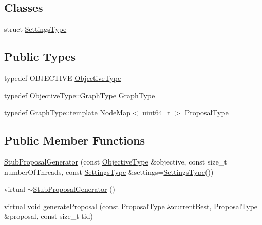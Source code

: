 \subsection*{Classes}
\begin{DoxyCompactItemize}
\item 
struct \hyperlink{structnifty_1_1graph_1_1optimization_1_1common_1_1StubProposalGenerator_1_1SettingsType}{Settings\+Type}
\end{DoxyCompactItemize}
\subsection*{Public Types}
\begin{DoxyCompactItemize}
\item 
typedef O\+B\+J\+E\+C\+T\+I\+V\+E \hyperlink{classnifty_1_1graph_1_1optimization_1_1common_1_1StubProposalGenerator_ae7d0ffc1c09e62f40d0dbee2ae7ae5d7}{Objective\+Type}
\item 
typedef Objective\+Type\+::\+Graph\+Type \hyperlink{classnifty_1_1graph_1_1optimization_1_1common_1_1StubProposalGenerator_ad5d7c98b50ccddc5ce4fbd83b2ca3214}{Graph\+Type}
\item 
typedef Graph\+Type\+::template Node\+Map$<$ uint64\+\_\+t $>$ \hyperlink{classnifty_1_1graph_1_1optimization_1_1common_1_1StubProposalGenerator_a1be02f6d87cf6bf34ee078b367d40538}{Proposal\+Type}
\end{DoxyCompactItemize}
\subsection*{Public Member Functions}
\begin{DoxyCompactItemize}
\item 
\hyperlink{classnifty_1_1graph_1_1optimization_1_1common_1_1StubProposalGenerator_a6ff51f0c779c17b8ed27c3381b3609c9}{Stub\+Proposal\+Generator} (const \hyperlink{classnifty_1_1graph_1_1optimization_1_1common_1_1StubProposalGenerator_ae7d0ffc1c09e62f40d0dbee2ae7ae5d7}{Objective\+Type} \&objective, const size\+\_\+t number\+Of\+Threads, const \hyperlink{structnifty_1_1graph_1_1optimization_1_1common_1_1StubProposalGenerator_1_1SettingsType}{Settings\+Type} \&settings=\hyperlink{structnifty_1_1graph_1_1optimization_1_1common_1_1StubProposalGenerator_1_1SettingsType}{Settings\+Type}())
\item 
virtual \hyperlink{classnifty_1_1graph_1_1optimization_1_1common_1_1StubProposalGenerator_abe642679e1bc368912c451bcac8bfe80}{$\sim$\+Stub\+Proposal\+Generator} ()
\item 
virtual void \hyperlink{classnifty_1_1graph_1_1optimization_1_1common_1_1StubProposalGenerator_ab8e44457d2c33326221b2291e4ff0246}{generate\+Proposal} (const \hyperlink{classnifty_1_1graph_1_1optimization_1_1common_1_1ProposalGeneratorBase_a4700eb43beb708a77c5c34612039c715}{Proposal\+Type} \&current\+Best, \hyperlink{classnifty_1_1graph_1_1optimization_1_1common_1_1ProposalGeneratorBase_a4700eb43beb708a77c5c34612039c715}{Proposal\+Type} \&proposal, const size\+\_\+t tid)
\end{DoxyCompactItemize}


